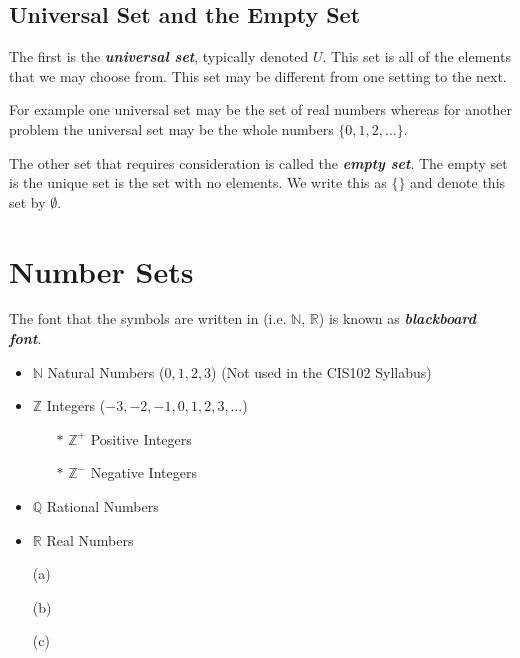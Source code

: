 \documentclass[12pt]{article}
\begin{document}
\subsection{Universal Set and the Empty Set}
The first is the \textbf{\textit{universal set}}, typically denoted $U$. This set is all of the elements that we may choose from. This set may be different from one setting to the next. 

For example one universal set may be the set of real numbers whereas for another problem the universal set may be the whole numbers $\{0, 1, 2,\ldots\}$.

The other set that requires consideration is called the \textit{\textbf{empty set}}. The empty set is the unique set is the set with no elements. We write this as $\{ \}$ and denote this set by $\emptyset$.


\section{Number Sets}
The font that the symbols are written in (i.e. $\mathbb{N}$, $\mathbb{R}$) is known as \textit{\textbf{blackboard font}}.
\begin{itemize}
\item $\mathbb{N}$ Natural Numbers ($0,1,2,3$) 
(Not used in the CIS102 Syllabus)
\item $\mathbb{Z}$ Integers ($-3,-2,-1,0,1,2,3, \ldots$)
\begin{itemize}
\item[$\ast$] $\mathbb{Z}^{+}$ Positive Integers
\item[$\ast$] $\mathbb{Z}^{-}$ Negative Integers
\end{itemize}
\item $\mathbb{Q}$ Rational Numbers
\item $\mathbb{R}$ Real Numbers
\end{itemize}

\begin{itemize}

\item[(a)] 

\item[(b)]

\item[(c)]

\end{itemize}
\end{document}
